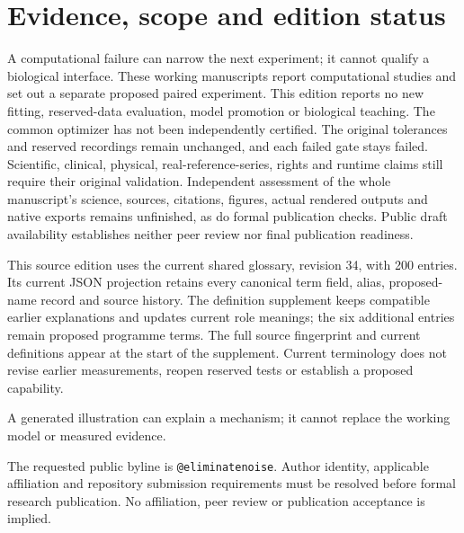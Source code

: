 \section*{Evidence, scope and edition status}
A computational failure can narrow the next experiment; it cannot qualify a
biological interface. These working manuscripts report computational
studies and set out a separate proposed paired experiment. This edition reports
no new fitting, reserved-data evaluation, model promotion or biological teaching.
The common optimizer has not been independently certified. The original
tolerances and reserved recordings remain unchanged, and each failed gate stays
failed. Scientific, clinical, physical, real-reference-series, rights and runtime
claims still require their original validation. Independent assessment of the
whole manuscript's science, sources, citations, figures, actual rendered outputs
and native exports remains unfinished, as do formal publication checks. Public draft availability establishes neither
peer review nor final publication readiness.

This source edition uses the current shared glossary, revision 34, with 200 entries.
Its current JSON projection retains every canonical term field, alias, proposed-name record and source history.
The definition supplement keeps compatible earlier explanations and updates current role meanings; the six additional entries remain proposed programme terms.
The full source fingerprint and current definitions appear at the start of the supplement.
Current terminology does not revise earlier measurements, reopen reserved tests or establish a proposed capability.

A generated illustration can explain a mechanism; it cannot replace
the working model or measured evidence.

The requested public byline is \texttt{@eliminatenoise}. Author identity,
applicable affiliation and repository submission requirements must be resolved
before formal research publication. No affiliation, peer review or publication acceptance is implied.
